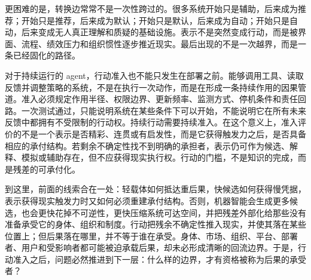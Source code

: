 更困难的是，转换边常常不是一次性跨过的。很多系统开始只是辅助，后来成为推荐；开始只是推荐，后来成为默认；开始只是默认，后来成为自动；开始只是自动，后来变成无人真正理解和质疑的基础设施。表示不是突然变成行动，而是被界面、流程、绩效压力和组织惯性逐步推近现实。最后出现的不是一次越界，而是一条已经固化的路径。

对于持续运行的 agent，行动准入也不能只发生在部署之前。能够调用工具、读取反馈并调整策略的系统，不是在执行一次动作，而是在形成一条持续作用的因果管道。准入必须规定作用半径、权限边界、更新频率、监测方式、停机条件和责任回路。一次测试通过，只能说明系统在某些条件下可以开始，不能说明它在所有未来反馈中都拥有不受限制的行动权。持续行动需要持续准入。在这个意义上，准入评价的不是一个表示是否精彩、连贯或有启发性，而是它获得触发力之后，是否具备相应的承付结构。若剩余不确定性找不到明确的承担者，表示仍可作为候选、解释、模拟或辅助存在，但不应获得现实执行权。行动的门槛，不是知识的完成，而是残差的可承付化。

到这里，前面的线索合在一处：轻载体如何抵达重后果，快候选如何获得慢凭据，表示获得现实触发力时又如何必须重建承付结构。否则，机器智能会生成更多候选，也会更快花掉不可逆性，更快压缩系统可达空间，并把残差外部化给那些没有准备承受它的身体、组织和制度。行动把残余不确定性推入现实，并使其落在某些位置上；但后果落在哪里，并不等于谁在承受。身体、市场、组织、平台、部署者、用户和受影响者都可能被迫承载后果，却未必形成清晰的回流边界。于是，行动准入之后，问题必然推进到下一层：什么样的边界，才有资格被称为后果的承受者？
